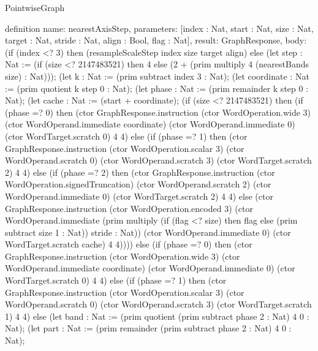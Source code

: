 \begin{lexlean}{PointwiseGraph}
\begin{semanticmodule}
definition{
  name: nearestAxisStep,
  parameters: [index : Nat, start : Nat, size : Nat, target : Nat, stride : Nat, align : Bool, flag : Nat],
  result: GraphResponse,
  body: (if (index <? 3) then (resampleScaleStep index size target align) else (let step : Nat := (if (size <? 2147483521) then 4 else (2 + (prim multiply 4 (nearestBands size) : Nat)));
      (let k : Nat := (prim subtract index 3 : Nat);
      (let coordinate : Nat := (prim quotient k step 0 : Nat);
      (let phase : Nat := (prim remainder k step 0 : Nat);
      (let cache : Nat := (start + coordinate);
      (if (size <? 2147483521) then (if (phase =? 0) then (ctor GraphResponse.instruction (ctor WordOperation.wide 3) (ctor WordOperand.immediate coordinate) (ctor WordOperand.immediate 0) (ctor WordTarget.scratch 0) 4 4) else (if (phase =? 1) then (ctor GraphResponse.instruction (ctor WordOperation.scalar 3) (ctor WordOperand.scratch 0) (ctor WordOperand.scratch 3) (ctor WordTarget.scratch 2) 4 4) else (if (phase =? 2) then (ctor GraphResponse.instruction (ctor WordOperation.signedTruncation) (ctor WordOperand.scratch 2) (ctor WordOperand.immediate 0) (ctor WordTarget.scratch 2) 4 4) else (ctor GraphResponse.instruction (ctor WordOperation.encoded 3) (ctor WordOperand.immediate (prim multiply (if (flag <? size) then flag else (prim subtract size 1 : Nat)) stride : Nat)) (ctor WordOperand.immediate 0) (ctor WordTarget.scratch cache) 4 4)))) else (if (phase =? 0) then (ctor GraphResponse.instruction (ctor WordOperation.wide 3) (ctor WordOperand.immediate coordinate) (ctor WordOperand.immediate 0) (ctor WordTarget.scratch 0) 4 4) else (if (phase =? 1) then (ctor GraphResponse.instruction (ctor WordOperation.scalar 3) (ctor WordOperand.scratch 0) (ctor WordOperand.scratch 3) (ctor WordTarget.scratch 1) 4 4) else (let band : Nat := (prim quotient (prim subtract phase 2 : Nat) 4 0 : Nat);
      (let part : Nat := (prim remainder (prim subtract phase 2 : Nat) 4 0 : Nat);
}
\end{semanticmodule}
\end{lexlean}
